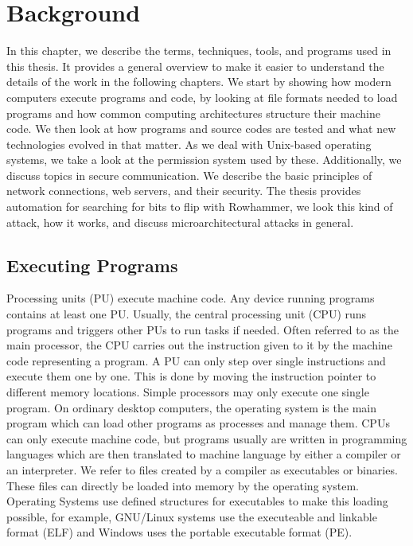 \chapter{Background}\label{sec:general}

In this chapter, we describe the terms, techniques, tools, and programs used in
this thesis. It provides a general overview to make it easier to understand the
details of the work in the following chapters. We start by showing how modern
computers execute programs and code, by looking at file formats needed to load
programs and how common computing architectures structure their machine code.
We then look at how programs and source codes are tested and what new
technologies evolved in that matter. As we deal with Unix-based operating
systems, we take a look at the permission system used by these. Additionally,
we discuss topics in secure communication. We describe the basic principles of
network connections, web servers, and their security. The thesis provides
automation for searching for bits to flip with Rowhammer, we look this kind of
attack, how it works, and discuss microarchitectural attacks in general.

\section{Executing Programs}

Processing units (PU) execute machine code. Any device running programs contains
at least one PU. Usually, the central processing unit (CPU) runs programs and
triggers other PUs to run tasks if needed. Often referred to as the main
processor, the CPU carries out the instruction given to it by the machine code
representing a program. A PU can only step over single instructions and execute
them one by one. This is done by moving the instruction pointer to different
memory locations. Simple processors may only execute one single program. On
ordinary desktop computers, the operating system is the main program which can
load other programs as processes and manage them. CPUs can only execute machine
code, but programs usually are written in programming languages which are then
translated to machine language by either a compiler or an interpreter. We refer
to files created by a compiler as executables or binaries. These files can
directly be loaded into memory by the operating system. Operating Systems use
defined structures for executables to make this loading possible, for example,
GNU/Linux systems use the executeable and linkable format (ELF) and Windows
uses the portable executable format (PE).

